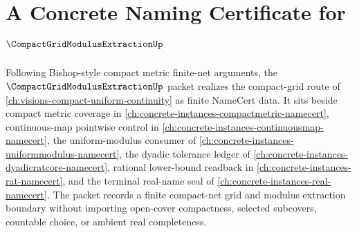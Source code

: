 \chapter{A Concrete Naming Certificate for $\CompactGridModulusExtractionUp$}
\label{ch:concrete-instances-compact-grid-modulus-extraction-namecert}

Following Bishop-style compact metric finite-net arguments, the $\CompactGridModulusExtractionUp$ packet realizes the compact-grid route of \autoref{ch:visions-compact-uniform-continuity} as finite NameCert data. It sits beside compact metric coverage in \autoref{ch:concrete-instances-compactmetric-namecert}, continuous-map pointwise control in \autoref{ch:concrete-instances-continuousmap-namecert}, the uniform-modulus consumer of \autoref{ch:concrete-instances-uniformmodulus-namecert}, the dyadic tolerance ledger of \autoref{ch:concrete-instances-dyadicratcore-namecert}, rational lower-bound readback in \autoref{ch:concrete-instances-rat-namecert}, and the terminal real-name seal of \autoref{ch:concrete-instances-real-namecert}. The packet records a finite compact-net grid and modulus extraction boundary without importing open-cover compactness, selected subcovers, countable choice, or ambient real completeness.


